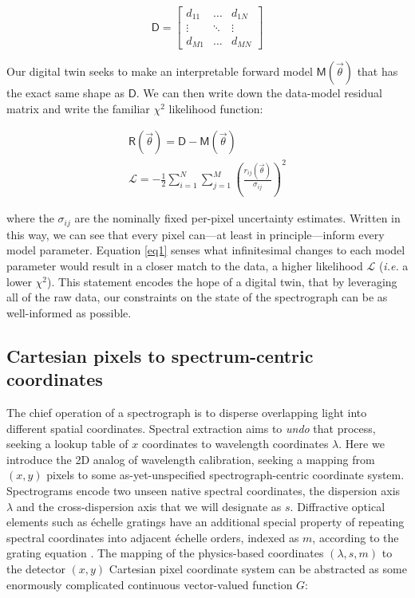 \documentclass[twocolumn]{aastex631}
\begin{document}
\begin{equation}
  \boldsymbol{\mathsf{D}} =  \begin{bmatrix}
    d_{11} & \dots  & d_{1N}                       \\
    \vdots & \ddots & \vdots                       \\
    d_{M1} & \dots  & d_{MN} \label{eqDenseMatrix}
  \end{bmatrix}
\end{equation}

Our digital twin seeks to make an interpretable forward model $\boldsymbol{\mathsf{M}}(\vec{\theta})$ that has the exact same shape as $\boldsymbol{\mathsf{D}}$.  We can then write down the data-model residual matrix and write the familiar $\chi^2$ likelihood function:

\begin{eqnarray}
  \boldsymbol{\mathsf{R}}(\vec{\theta}) = \boldsymbol{\mathsf{D}} - \boldsymbol{\mathsf{M}}(\vec{\theta}) \\
  \mathcal{L} = -\frac{1}{2} \sum_{i=1}^{N}\sum_{j=1}^{M} \left ( \frac{r_{ij}(\vec{\theta})}{\sigma_{ij}} \right )^2 \label{eqChiSq}
\end{eqnarray}

where the $\sigma_{ij}$ are the nominally fixed per-pixel uncertainty estimates.  Written in this way, we can see that every pixel can---at least in principle---inform every model parameter.  Equation \ref{eq1} senses what infinitesimal changes to each model parameter would result in a closer match to the data, a higher likelihood $\mathcal{L}$ (\emph{i.e.} a lower $\chi^2$).  This statement encodes the hope of a digital twin, that by leveraging all of the raw data, our constraints on the state of the spectrograph can be as well-informed as possible.

\subsection{Cartesian pixels to spectrum-centric coordinates}



The chief operation of a spectrograph is to disperse overlapping light into different spatial coordinates.  Spectral extraction aims to \emph{undo} that process, seeking a lookup table of $x$ coordinates to wavelength coordinates $\lambda$.  Here we introduce the 2D analog of wavelength calibration, seeking a mapping from $(x, y)$ pixels to some as-yet-unspecified spectrograph-centric coordinate system.  Spectrograms encode two unseen native spectral coordinates, the dispersion axis $\lambda$ and the cross-dispersion axis that we will designate as $s$.  Diffractive optical elements such as \'echelle gratings have an additional special property of repeating spectral coordinates into adjacent \'echelle orders, indexed as $m$, according to the grating equation \citep{2012sdf..book.....J}.  The mapping of the physics-based coordinates $(\lambda, s, m)$ to the detector $(x, y)$ Cartesian pixel coordinate system can be abstracted as some enormously complicated continuous vector-valued function $G$:
\end{document}
